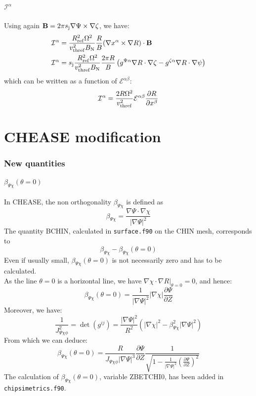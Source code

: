 \documentclass[a4paper,12pt]{article}
\newcommand{\ind}[1]{\ensuremath{_{\rm{#1}}}}
\begin{document}
\subsubsection{$\mathcal{I}^\alpha$}
Using again $\textbf{B}=2\pi s\ind{j}\nabla\Psi\times\nabla\zeta$, we have:
\begin{align*}
\mathcal{I}^\alpha&=\frac{R\ind{ref}^2\Omega^2}{v\ind{thref}^2B\ind{N}}\frac{R}{B}(\nabla x^\alpha\times\nabla R)\cdot\mathbf{B}\\
\mathcal{I}^\alpha&=s\ind{j}\frac{R\ind{ref}^2\Omega^2}{v\ind{thref}^2B\ind{N}}\frac{2\pi R}{B}\left( g^{\Psi\alpha}\nabla R\cdot\nabla\zeta - g^{\zeta\alpha}\nabla R\cdot\nabla\psi \right)\\
\end{align*}
which can be written as a function of $\mathcal{E}^{\alpha\beta}$:
$$\mathcal{I}^\alpha=\frac{2R\Omega^2}{v\ind{thref}^2}\mathcal{E}^{\alpha\beta}\frac{\partial R}{\partial x^\beta}$$

\part{CHEASE modification}
\section{New quantities}
\subsection{$\beta_{\Psi \chi}\left(\theta=0\right)$}
In CHEASE, the non orthogonality $\beta_{\Psi \chi}$ is defined as 
$$\beta_{\Psi \chi}=\frac{\nabla\Psi\cdot\nabla\chi}{\left|\nabla \Psi \right|^2}$$
The quantity BCHIN, calculated in \texttt{surface.f90} on the CHIN mesh, corresponds to $$\beta_{\Psi \chi}-\beta_{\Psi \chi}\left(\theta=0\right)$$
Even if usually small, $\beta_{\Psi \chi}\left(\theta=0\right)$ is not necessarily zero and has to be calculated. \\
As the line $\theta=0$ is a horizontal line, we have $\nabla\chi\cdot\nabla R|_{\theta=0}=0$, and hence:
$$\beta_{\Psi \chi}\left(\theta=0\right)=\frac{1}{|\nabla \Psi|^2}|\nabla \chi|\frac{\partial{\Psi}}{\partial{Z}}$$
Moreover, we have:
$$\frac{1}{J_{\Psi\chi\phi}^2}=\det\left(g^{ij}\right)=\frac{|\nabla \Psi|^2}{R^2}\left(|\nabla \chi|^2 - \beta_{\Psi \chi}^2 |\nabla \Psi|^2\right)$$
From which we can deduce:
$$\beta_{\Psi \chi}\left(\theta=0\right)=\frac{R}{J_{\Psi\chi\phi}|\nabla\Psi|^3}\frac{\partial{\Psi}}{\partial{Z}}\frac{1}{\sqrt{1-\frac{1}{|\nabla\Psi|^2}\left(\frac{\partial{\Psi}}{\partial Z}\right)^2}}$$
The calculation of $\beta_{\Psi \chi}\left(\theta=0\right)$, variable ZBETCHI0, has been added in \texttt{chipsimetrics.f90}.
\end{document}
